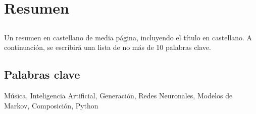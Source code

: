 \chapter*{Resumen}

\section*{\tituloPortadaVal}

Un resumen en castellano de media página, incluyendo el título en castellano. A continuación, se escribirá una lista de no más de 10 palabras clave.


\section*{Palabras clave}
   
\noindent Música, Inteligencia Artificial, Generación, Redes Neuronales, Modelos de Markov, Composición, Python

   


